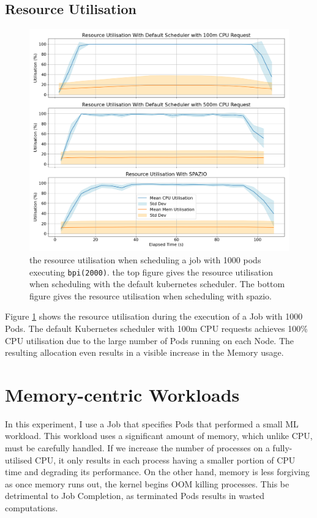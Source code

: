 \subsection{Resource Utilisation}
\begin{figure}[h]
    \centering
    \includegraphics[width=\textwidth]{images/pi-util.png}
    \caption{the resource utilisation when scheduling a job with 1000 pods
    executing \texttt{bpi(2000)}. the top figure gives the resource utilisation
    when scheduling with the default kubernetes scheduler. The bottom figure
    gives the resource utilisation when scheduling with spazio.}
    \label{fig:pi-2000-1000x-pod-util}
\end{figure}

Figure \ref{fig:pi-2000-1000x-pod-util} shows the resource utilisation during
the execution of a Job with 1000 Pods. The default Kubernetes scheduler with
100m CPU requests achieves 100\% CPU utilisation due to the large number of Pods
running on each Node. The resulting allocation even results in a visible
increase in the Memory usage.

\section{Memory-centric Workloads}
\label{sec:eval-mem-centric}
In this experiment, I use a Job that specifies Pods that performed a small ML
workload. This workload uses a significant amount of memory, which unlike CPU,
must be carefully handled. If we increase the number of processes on a
fully-utilised CPU, it only results in each process having a smaller portion of
CPU time and degrading its performance. On the other hand, memory is less
forgiving as once memory runs out, the kernel begins OOM killing processes. This
be detrimental to Job Completion, as terminated Pods results in wasted
computations.

